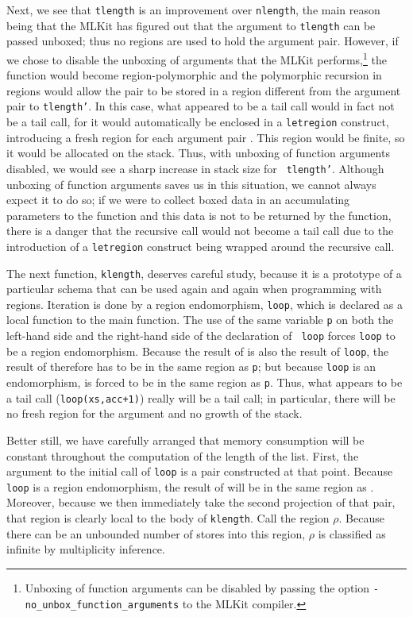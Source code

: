 \documentclass[12pt]{book}
\begin{document}
Next, we see that {\tt tlength} is an improvement over {\tt nlength},
the main reason being that the MLKit has figured out that the argument
to {\tt tlength} can be passed unboxed; thus no regions are used to
hold the argument pair. However, if we chose to disable the unboxing
of arguments that the MLKit performs,\footnote{Unboxing of function
  arguments can be disabled by passing the option
  \texttt{-no\_unbox\_function\_arguments} to the MLKit compiler.} the
function would become region-polymorphic and the polymorphic recursion
in regions would allow the pair  to be stored in a
region different from the argument pair to {\tt tlength'}. In this
case, what appeared to be a tail call would in fact not be a tail
call, for it would automatically be enclosed in a {\tt letregion}
construct, introducing a fresh region for each argument pair
.  This region would be finite, so it would be
allocated on the stack.  Thus, with unboxing of function arguments
disabled, we would see a sharp increase in stack size for {\tt
  tlength'}. Although unboxing of function arguments saves us in this
situation, we cannot always expect it to do so; if we were to collect
boxed data in an accumulating parameters to the function and this data
is not to be returned by the function, there is a danger that the
recursive call would not become a tail call due to the introduction of
a {\tt letregion} construct being wrapped around the recursive call.

The next function, {\tt klength}, deserves careful study, because it
is a prototype of a particular schema that can be used again and again
when programming with regions. Iteration is done by a
%
region endomorphism, {\tt loop}, which is declared as a local function
to the main function. The use of the same variable {\tt p} on both the
left-hand side and the right-hand side of the declaration of {\tt
  loop} forces {\tt loop} to be a region endomorphism. Because the
result of  is also the result of {\tt loop}, the
result of  therefore has to be in the same
region as {\tt p}; but because {\tt loop} is an endomorphism,
 is forced to be in the same region as {\tt p}.
Thus, what appears to be a tail call ({\tt loop(xs,acc+1)}) really
will be a tail call; in particular, there will be no fresh region for
the argument and no growth of the stack.

Better still, we have carefully arranged that memory consumption will
be constant throughout the computation of the length of the list.
First, the argument to the initial call of {\tt loop} is a pair
 constructed at that point. Because {\tt loop} is a
region endomorphism, the result of  will be in the
same region as .  Moreover, because we then immediately
take the second projection of that pair, that region is clearly local
to the body of {\tt klength}.  Call the region $\rho$. Because there
can be an unbounded number of stores into this region, $\rho$ is
classified as infinite by multiplicity inference.
\end{document}
